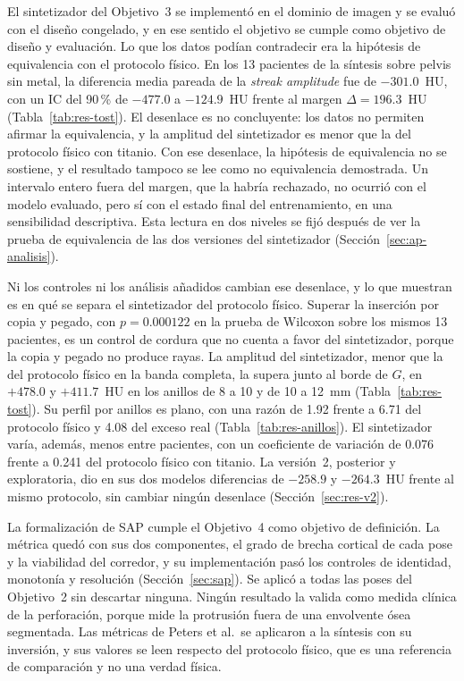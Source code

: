 El sintetizador del Objetivo~3 se implementó en el dominio de imagen y se evaluó con el diseño congelado, y en ese sentido el objetivo se cumple como objetivo de diseño y evaluación. Lo que los datos podían contradecir era la hipótesis de equivalencia con el protocolo físico. En los 13 pacientes de la síntesis sobre pelvis sin metal, la diferencia media pareada de la \emph{streak amplitude} fue de $-301.0$~HU, con un IC del 90\,\% de $-477.0$ a $-124.9$~HU frente al margen $\Delta = 196.3$~HU (Tabla~\ref{tab:res-tost}). El desenlace es no concluyente: los datos no permiten afirmar la equivalencia, y la amplitud del sintetizador es menor que la del protocolo físico con titanio. Con ese desenlace, la hipótesis de equivalencia no se sostiene, y el resultado tampoco se lee como no equivalencia demostrada. Un intervalo entero fuera del margen, que la habría rechazado, no ocurrió con el modelo evaluado, pero sí con el estado final del entrenamiento, en una sensibilidad descriptiva. Esta lectura en dos niveles se fijó después de ver la prueba de equivalencia de las dos versiones del sintetizador (Sección~\ref{sec:ap-analisis}).

Ni los controles ni los análisis añadidos cambian ese desenlace, y lo que muestran es en qué se separa el sintetizador del protocolo físico. Superar la inserción por copia y pegado, con $p = 0.000122$ en la prueba de Wilcoxon sobre los mismos 13 pacientes, es un control de cordura que no cuenta a favor del sintetizador, porque la copia y pegado no produce rayas. La amplitud del sintetizador, menor que la del protocolo físico en la banda completa, la supera junto al borde de $G$, en $+478.0$ y $+411.7$~HU en los anillos de 8 a 10 y de 10 a 12~mm (Tabla~\ref{tab:res-tost}). Su perfil por anillos es plano, con una razón de 1.92 frente a 6.71 del protocolo físico y 4.08 del exceso real (Tabla~\ref{tab:res-anillos}). El sintetizador varía, además, menos entre pacientes, con un coeficiente de variación de 0.076 frente a 0.241 del protocolo físico con titanio. La versión~2, posterior y exploratoria, dio en sus dos modelos diferencias de $-258.9$ y $-264.3$~HU frente al mismo protocolo, sin cambiar ningún desenlace (Sección~\ref{sec:res-v2}).

La formalización de SAP cumple el Objetivo~4 como objetivo de definición. La métrica quedó con sus dos componentes, el grado de brecha cortical de cada pose y la viabilidad del corredor, y su implementación pasó los controles de identidad, monotonía y resolución (Sección~\ref{sec:sap}). Se aplicó a todas las poses del Objetivo~2 sin descartar ninguna. Ningún resultado la valida como medida clínica de la perforación, porque mide la protrusión fuera de una envolvente ósea segmentada. Las métricas de Peters et al.\ se aplicaron a la síntesis con su inversión, y sus valores se leen respecto del protocolo físico, que es una referencia de comparación y no una verdad física.

